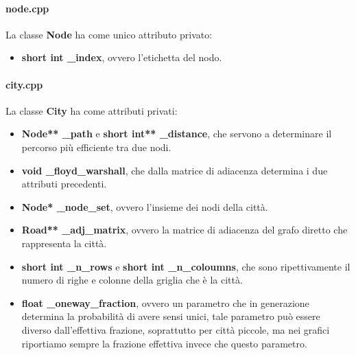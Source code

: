 \documentclass{article}
\newcommand{\bb}[1]{\textbf{#1}}
\begin{document}
        \paragraph{node.cpp}
            La classe \bb{Node} ha come unico attributo privato:
            \begin{itemize}
                \item \bb{short int \_index}, ovvero l'etichetta del nodo.
            \end{itemize}
        \paragraph{city.cpp}
            La classe \bb{City} ha come attributi privati:
            \begin{itemize}
                \item \bb{Node** \_path} e \bb{short int** \_distance}, che servono a determinare il percorso più efficiente tra due nodi.
                \item \bb{void \_floyd\_warshall}, che dalla matrice di adiacenza determina i due attributi precedenti.
                \item \bb{Node* \_node\_set}, ovvero l'insieme dei nodi della città.
                \item \bb{Road** \_adj\_matrix}, ovvero la matrice di adiacenza del grafo diretto che rappresenta la città.
                \item \bb{short int \_n\_rows} e \bb{short int \_n\_coloumns}, che sono ripettivamente il numero di righe e colonne della griglia che è la città.
                \item \bb{float \_oneway\_fraction}, ovvero un parametro che in generazione determina la probabilità di avere sensi unici,
                    tale parametro può essere diverso dall'effettiva frazione, soprattutto per città piccole, ma nei grafici riportiamo sempre la 
                    frazione effettiva invece che questo parametro.
            \end{itemize}
\end{document}
